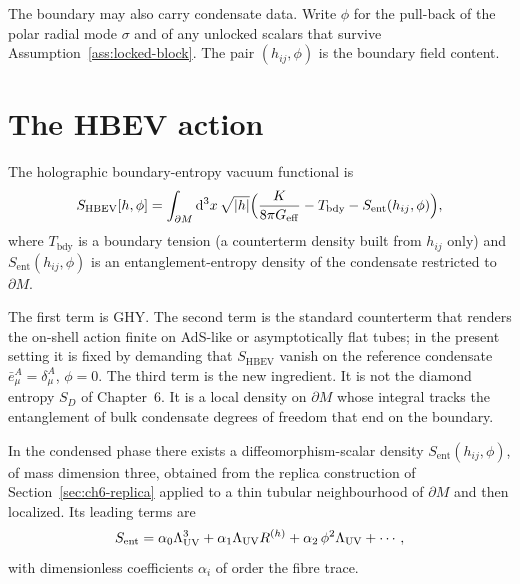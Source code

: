 The boundary may also carry condensate data. Write \(\phi\) for the
pull-back of the polar radial mode \(\sigma\) and of any unlocked
scalars that survive Assumption~\ref{ass:locked-block}. The pair
\((h_{ij},\phi)\) is the boundary field content.

\section{The HBEV action}
\label{sec:ch12-action}

\begin{definition}
  \label{def:HBEV}
  The holographic boundary-entropy vacuum functional is
  \begin{equation}
    \label{eq:SHBEV}
    S_{\mathrm{HBEV}}[h,\phi]
    =\int_{\partial M}\mathrm{d}^3x\,\sqrt{|h|}
     \Bigl(
       \frac{K}{8\pi G_{\mathrm{eff}}}
       -T_{\mathrm{bdy}}
       -S_{\mathrm{ent}}(h_{ij},\phi)
     \Bigr),
  \end{equation}
  where \(T_{\mathrm{bdy}}\) is a boundary tension (a
  counterterm density built from \(h_{ij}\) only) and
  \(S_{\mathrm{ent}}(h_{ij},\phi)\) is an entanglement-entropy
  density of the condensate restricted to \(\partial M\).
\end{definition}

The first term is GHY. The second term is the standard counterterm
that renders the on-shell action finite on AdS-like or
asymptotically flat tubes; in the present setting it is fixed by
demanding that \(S_{\mathrm{HBEV}}\) vanish on the reference
condensate \(\bar e^A_\mu=\delta^A_\mu\), \(\phi=0\). The third term
is the new ingredient. It is not the diamond entropy \(S_D\) of
Chapter~6. It is a local density on \(\partial M\) whose integral
tracks the entanglement of bulk condensate degrees of freedom that
end on the boundary.

\begin{assumption}
  \label{ass:Sent-density}
  In the condensed phase there exists a diffeomorphism-scalar
  density \(S_{\mathrm{ent}}(h_{ij},\phi)\), of mass dimension
  three, obtained from the replica construction of
  Section~\ref{sec:ch6-replica} applied to a thin tubular
  neighbourhood of \(\partial M\) and then localized. Its leading
  terms are
  \begin{equation}
    \label{eq:Sent-exp}
    S_{\mathrm{ent}}
    =\alpha_0\Lambda_{\mathrm{UV}}^3
     +\alpha_1\Lambda_{\mathrm{UV}} R^{(h)}
     +\alpha_2\,\phi^2\Lambda_{\mathrm{UV}}
     +\cdots,
  \end{equation}
  with dimensionless coefficients \(\alpha_i\) of order the fibre
  trace.
\end{assumption}

